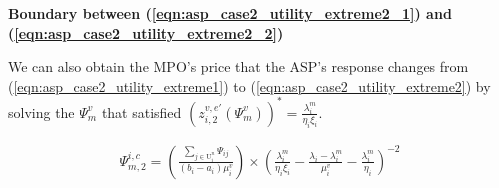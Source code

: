 \documentclass[10pt,journal, compsoc]{IEEEtran}
\begin{document}
\textbf{Boundary between (\ref{eqn:asp_case2_utility_extreme2_1}) and (\ref{eqn:asp_case2_utility_extreme2_2})}

We can also obtain the MPO's price that the ASP's response changes from (\ref{eqn:asp_case2_utility_extreme1}) to (\ref{eqn:asp_case2_utility_extreme2}) by solving the $\Psi^v_m$ that satisfied $(z_{i,2}^{v,e'}(\Psi_m^v))^* = \frac{\lambda_i^m}{\eta_i \xi_i}$.

\begin{equation}
    \begin{aligned}
        \Psi_{m,2}^{i, c} = (\frac{\sum_{j \in \mathrm{U}_i^n}\Psi_{ij}}{(b_i-a_i)\mu_i^v}) \times (\frac{\lambda_i^m}{\eta_i\xi_i} - \frac{\lambda_i - \lambda_i^m}{\mu_i^v} - \frac{\lambda_i^m}{\eta_i})^{-2}
    \end{aligned}
\end{equation}


\end{document}

